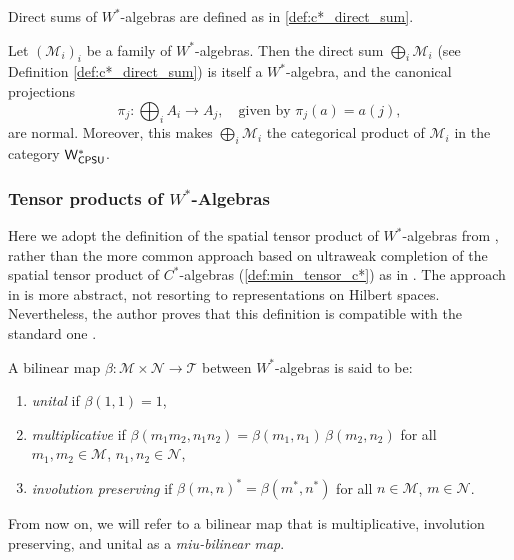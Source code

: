 Direct sums of $W^*$-algebras are defined as in \autoref{def:c*_direct_sum}.


\begin{proposition} \cite[Exercise 47 IV]{westerbaanCategoryNeumannAlgebras2019}  \label{prop:wcpsu_products}
  Let \( (\mathscr{M}_i)_i \) be a family of $W^*$-algebras. Then the direct sum \( \bigoplus_i \mathscr{M}_i \) (see Definition \ref{def:c*_direct_sum}) is itself a $W^*$-algebra, and the canonical projections
\[
\pi_j : \bigoplus_i A_i \to A_j, \quad \text{given by } \pi_j(a) = a(j),
\]
are normal.
Moreover, this makes \( \bigoplus_i \mathscr{M}_i \) the categorical product of \( \mathscr{M}_i \) in the category $\mathsf{W^*_{CPSU}}$.
\end{proposition}


\subsubsection{Tensor products of $W^*$-Algebras}
Here we adopt the definition of the spatial tensor product of $W^*$-algebras from \cite{westerbaanCategoryNeumannAlgebras2019}, rather than the more common approach based on ultraweak completion of the spatial tensor product of $C^*$-algebras (\autoref{def:min_tensor_c*}) as in \cite{takesakiTheoryOperatorAlgebras1979,sakaiCAlgebrasWAlgebras1998}. 
The approach in \cite{westerbaanCategoryNeumannAlgebras2019} is more abstract, not resorting to representations on Hilbert spaces. Nevertheless, the author proves that this definition is compatible with the standard one \cite[Theorem 111 VII]{westerbaanCategoryNeumannAlgebras2019}.


\begin{definition}
  A bilinear map \( \beta:  \mathscr{M} \times  \mathscr{N} \to  \mathscr{T} \) between $W^*$-algebras is said to be:
\begin{enumerate}
    \item \emph{unital} if \( \beta(1,1) = 1 \),
    \item \emph{multiplicative} if \( \beta(m_1m_2, n_1n_2) = \beta(m_1, n_1) \, \beta(m_2, n_2) \) for all \( m_1, m_2 \in \mathscr{M} \), \( n_1, n_2  \in \mathscr{N} \),
    \item \emph{involution preserving} if \( \beta(m, n)^* = \beta(m^*, n^*) \) for all \( n \in \mathscr{M} \), \( m \in \mathscr{N} \).
\end{enumerate}
From now on, we will refer to a bilinear map that is multiplicative, involution preserving, and unital as a \emph{miu-bilinear map}.
\end{definition}


